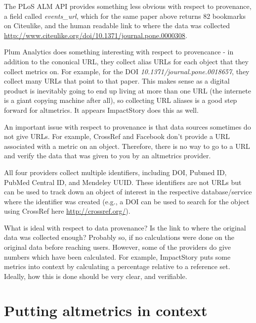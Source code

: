 \documentclass[letterpaper,superscriptaddress,showkeys,longbibliography]{revtex4-1}\usepackage{graphicx, color}
\begin{document}
The PLoS ALM API provides something less obvious with respect to provenance, a field called \emph{events\_url}, which for the same paper above \cite{piwowar2007} returns 82 bookmarks on Citeulike, and the human readable link to where the data was collected \url{http://www.citeulike.org/doi/10.1371/journal.pone.0000308}. 

Plum Analytics does something interesting with respect to provencance - in addition to the cononical URL, they collect alias URLs for each object that they collect metrics on. For example, for the DOI \emph{10.1371/journal.pone.0018657}, they collect many URLs that point to that paper. This makes sense as a digital product is inevitably going to end up living at more than one URL (the internete is a giant copying machine after all), so collecting URL aliases is a good step forward for altmetrics. It appears ImpactStory does this as well.

An important issue with respect to provenance is that data sources sometimes do not give URLs. For example, CrossRef and Facebook don't provide a URL associated with a metric on an object. Therefore, there is no way to go to a URL and verify the data that was given to you by an altmetrics provider. 

All four providers collect multiple identifiers, including DOI, Pubmed ID, PubMed Central ID, and Mendeley UUID. These identifiers are not URLs but can be used to track down an object of interest in the respective database/service where the identifier was created (e.g., a DOI can be used to search for the object using CrossRef here \url{http://crossref.org/}). 

What is ideal with respect to data provenance? Is the link to where the original data was collected enough? Probably so, if no calculations were done on the original data before reaching users. However, some of the providers do give numbers which have been calculated. For example, ImpactStory puts some metrics into context by calculating a percentage relative to a reference set. Ideally, how this is done should be very clear, and verifiable. 

\section*{Putting altmetrics in context}
\end{document}
